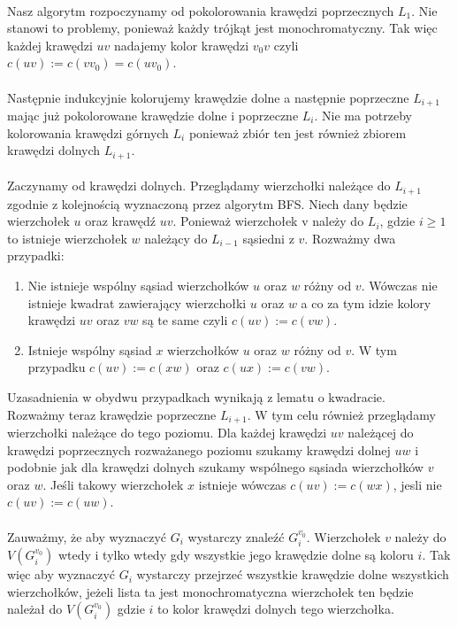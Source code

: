 \documentclass[12pt,a4paper,titlepage]{article}
\begin{document}
\\
Nasz algorytm rozpoczynamy od pokolorowania krawędzi poprzecznych $L_1$. Nie stanowi to problemy, ponieważ każdy trójkąt jest monochromatyczny. Tak więc każdej krawędzi $uv$ nadajemy kolor krawędzi $v_0 v$ czyli $c(uv):=c(v v_0 )=c(u v_0 )$.\\
\\
Następnie indukcyjnie kolorujemy krawędzie dolne a następnie poprzeczne $L_{i+1}$ mając już pokolorowane krawędzie dolne i poprzeczne $L_i$. Nie ma potrzeby kolorowania krawędzi górnych $L_i$ ponieważ zbiór ten jest również zbiorem krawędzi dolnych $L_{i+1}$.\\
\\
Zaczynamy od krawędzi dolnych. Przeglądamy wierzchołki należące do $L_{i+1}$ zgodnie z kolejnością wyznaczoną przez algorytm BFS. Niech dany będzie wierzchołek $u$ oraz krawędź $uv$. Ponieważ wierzchołek v należy do $L_i$, gdzie $i\geqslant 1$ to istnieje wierzchołek $w$ należący do $L_{i-1}$ sąsiedni z $v$. Rozważmy dwa przypadki:
\begin{enumerate}
\item Nie istnieje wspólny sąsiad wierzchołków $u$ oraz $w$ różny od $v$. Wówczas nie istnieje kwadrat zawierający wierzchołki $u$ oraz $w$ a co za tym idzie kolory krawędzi $uv$ oraz $vw$ są te same czyli $c(uv):=c(vw)$.
\item Istnieje wspólny sąsiad $x$ wierzchołków $u$ oraz $w$ różny od $v$. W tym przypadku $c(uv):=c(xw)$ oraz $c(ux):=c(vw)$. 
\end{enumerate}
Uzasadnienia w obydwu przypadkach wynikają z lematu o kwadracie.\\
Rozważmy teraz krawędzie poprzeczne $L_{i+1}$. W tym celu również przeglądamy wierzchołki należące do tego poziomu. Dla każdej krawędzi $uv$ należącej do krawędzi poprzecznych rozważanego poziomu szukamy krawędzi dolnej $uw$ i podobnie jak dla krawędzi dolnych szukamy wspólnego sąsiada wierzchołków $v$ oraz $w$. Jeśli takowy wierzchołek $x$ istnieje wówczas $c(uv):=c(wx)$, jesli nie $c(uv):=c(uw)$.\\
\\
Zauważmy, że aby wyznaczyć $G_i$ wystarczy znaleźć $G_i ^{v_0}$. Wierzchołek $v$ należy do $V(G_i ^{v_0})$ wtedy i tylko wtedy gdy wszystkie jego krawędzie dolne są koloru $i$. Tak więc aby wyznaczyć $G_i$ wystarczy przejrzeć wszystkie krawędzie dolne wszystkich wierzchołków, jeżeli lista ta jest monochromatyczna wierzchołek ten będzie należał do $V(G_i ^{v_0})$ gdzie $i$ to kolor krawędzi dolnych tego wierzchołka.\\
\end{document}
